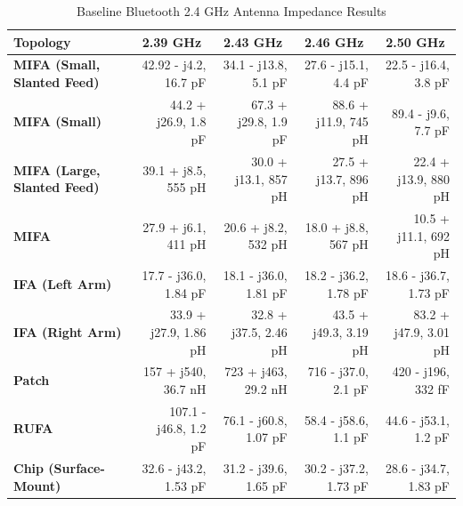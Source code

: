 \documentclass[journal,compsoc]{IEEEtran}
\begin{document}
\begin{table}[t]
  \centering
  \begin{tabular}{>{\bfseries}l|l l l l}
  \hline
    Topology & \multicolumn{1}{|c|}{2.39 GHz} & \multicolumn{1}{|c|}{2.43 GHz} & \multicolumn{1}{|c|}{2.46 GHz} & \multicolumn{1}{|c|}{2.50 GHz} \\
    \hline
    MIFA (Small, Slanted Feed) & \multicolumn{1}{|r|}{42.92 - j4.2, 16.7 pF} & \multicolumn{1}{|r|}{34.1 - j13.8, 5.1 pF} & \multicolumn{1}{|r|}{27.6 - j15.1, 4.4 pF} & \multicolumn{1}{|r|}{22.5 - j16.4, 3.8 pF} \\
    MIFA (Small) & \multicolumn{1}{|r|}{44.2 + j26.9, 1.8 pF} & \multicolumn{1}{|r|}{67.3 + j29.8, 1.9 pF} & \multicolumn{1}{|r|}{88.6 + j11.9, 745 pH} & \multicolumn{1}{|r|}{89.4 - j9.6, 7.7 pF} \\
    MIFA (Large, Slanted Feed) & \multicolumn{1}{|r|}{39.1 + j8.5, 555 pH} & \multicolumn{1}{|r|}{30.0 + j13.1, 857 pH} & \multicolumn{1}{|r|}{27.5 + j13.7, 896 pH} & \multicolumn{1}{|r|}{22.4 + j13.9, 880 pH} \\
    MIFA & \multicolumn{1}{|r|}{27.9 + j6.1, 411 pH} & \multicolumn{1}{|r|}{20.6 + j8.2, 532 pH} & \multicolumn{1}{|r|}{18.0 + j8.8, 567 pH} & \multicolumn{1}{|r|}{10.5 + j11.1, 692 pH} \\
    IFA (Left Arm) & \multicolumn{1}{|r|}{17.7 - j36.0, 1.84 pF} & \multicolumn{1}{|r|}{18.1 - j36.0, 1.81 pF} & \multicolumn{1}{|r|}{18.2 - j36.2, 1.78 pF} & \multicolumn{1}{|r|}{18.6 - j36.7, 1.73 pF} \\
    IFA (Right Arm) & \multicolumn{1}{|r|}{33.9 + j27.9, 1.86 pH} & \multicolumn{1}{|r|}{32.8 + j37.5, 2.46 pH} & \multicolumn{1}{|r|}{43.5 + j49.3, 3.19 pH} & \multicolumn{1}{|r|}{83.2 + j47.9, 3.01 pH} \\
    Patch & \multicolumn{1}{|r|}{157 + j540, 36.7 nH} & \multicolumn{1}{|r|}{723 + j463, 29.2 nH} & \multicolumn{1}{|r|}{716 - j37.0, 2.1 pF} & \multicolumn{1}{|r|}{420 - j196, 332 fF} \\
    RUFA & \multicolumn{1}{|r|}{107.1 - j46.8, 1.2 pF} & \multicolumn{1}{|r|}{76.1 - j60.8, 1.07 pF} & \multicolumn{1}{|r|}{58.4 - j58.6, 1.1 pF} & \multicolumn{1}{|r|}{44.6 - j53.1, 1.2 pF} \\
    Chip (Surface-Mount) & \multicolumn{1}{|r|}{32.6 - j43.2, 1.53 pF} & \multicolumn{1}{|r|}{31.2 - j39.6, 1.65 pF} & \multicolumn{1}{|r|}{30.2 - j37.2, 1.73 pF} & \multicolumn{1}{|r|}{28.6 - j34.7, 1.83 pF} \\ \hline
  \end{tabular} \newline
  \caption{Baseline Bluetooth 2.4 GHz Antenna Impedance Results}
\end{table}
\end{document}
